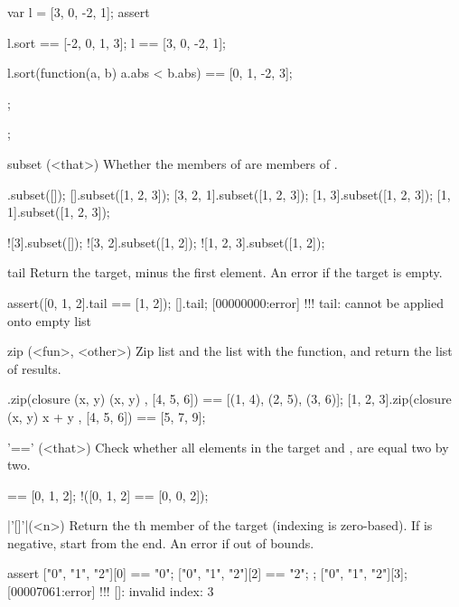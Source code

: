 \begin{urbiscriptapi}
\begin{urbiscript}
{
  var l = [3, 0, -2, 1];
  assert
  {
    l.sort == [-2, 0, 1, 3];
    l      == [3, 0, -2, 1];

    l.sort(function(a, b) {a.abs < b.abs})
           == [0, 1, -2, 3];
  };
};
\end{urbiscript}

\item[subset](<that>)%
  Whether the members of \this are members of .

\begin{urbiassert}
        [].subset([]);
        [].subset([1, 2, 3]);
 [3, 2, 1].subset([1, 2, 3]);
    [1, 3].subset([1, 2, 3]);
    [1, 1].subset([1, 2, 3]);

      ![3].subset([]);
   ![3, 2].subset([1, 2]);
![1, 2, 3].subset([1, 2]);
\end{urbiassert}

\item[tail]
  Return the target, minus the first element. An error if the target
  is empty.

\begin{urbiscript}
assert([0, 1, 2].tail == [1, 2]);
[].tail;
[00000000:error] !!! tail: cannot be applied onto empty list
\end{urbiscript}

\item[zip](<fun>, <other>)%
  Zip \this list and the  list with the  function, and
  return the list of results.

\begin{urbiassert}
[1, 2, 3].zip(closure (x, y) { (x, y) }, [4, 5, 6])
       == [(1, 4), (2, 5), (3, 6)];
[1, 2, 3].zip(closure (x, y) { x + y }, [4, 5, 6])
       == [5, 7, 9];
\end{urbiassert}

\item['=='](<that>)%
Check whether all elements in the target and , are
equal two by two.

\begin{urbiassert}
[0, 1, 2] == [0, 1, 2];
!([0, 1, 2] == [0, 0, 2]);
\end{urbiassert}

\item|'[]'|(<n>)%
  Return the th member of the target (indexing is
  zero-based). If  is negative, start from the end.  An error
  if out of bounds.

\begin{urbiscript}
assert
{
  ["0", "1", "2"][0] == "0";
  ["0", "1", "2"][2] == "2";
};
["0", "1", "2"][3];
[00007061:error] !!! []: invalid index: 3


\end{urbiscript}
\end{urbiscriptapi}
